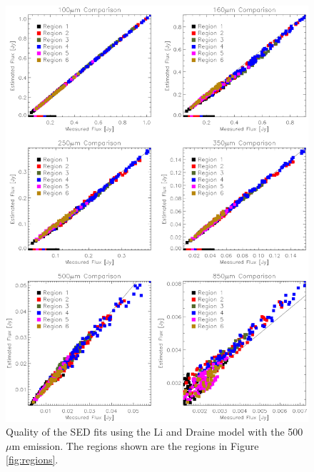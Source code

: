 \begin{figure}
  \centering
  \includegraphics[width=1.\textwidth]{sed_imgs/flux_compare_2_5.eps}
  \caption[Li and Draine Model SED Fit Quality Using 500$\mu$m Data]{Quality of the SED fits using the Li and Draine model with the 500$\mu$m emission.  The regions shown are the regions in Figure \ref{fig:regions}.}
  \label{fig:w2_5}
\end{figure}

